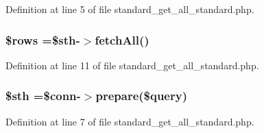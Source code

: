 Definition at line 5 of file standard\-\_\-get\-\_\-all\-\_\-standard.\-php.

\hypertarget{standard__get__all__standard_8php_ace2ec39e7df3899fa8df9640ec274b03}{
\subsubsection[{\$rows}]{\setlength{\rightskip}{0pt plus 5cm}\$rows =\$sth-\/$>$fetch\-All()}}\label{standard__get__all__standard_8php_ace2ec39e7df3899fa8df9640ec274b03}


Definition at line 11 of file standard\-\_\-get\-\_\-all\-\_\-standard.\-php.

\hypertarget{standard__get__all__standard_8php_afa9126f9664959c02795be300a135f93}{
\subsubsection[{\$sth}]{\setlength{\rightskip}{0pt plus 5cm}\$sth =\$conn-\/$>$prepare(\$query)}}\label{standard__get__all__standard_8php_afa9126f9664959c02795be300a135f93}


Definition at line 7 of file standard\-\_\-get\-\_\-all\-\_\-standard.\-php.

